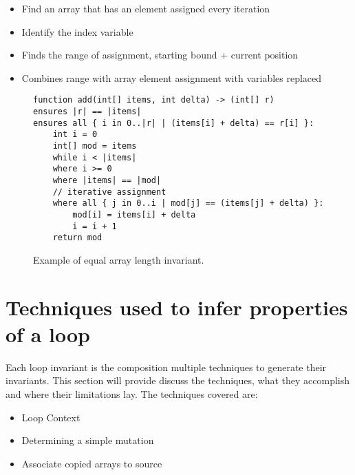 \begin{itemize}
	\item Find an array that has an element assigned every iteration
	\item Identify the index variable
	\item Finds the range of assignment, starting bound + current position
	\item Combines range with array element assignment with variables replaced
\end{itemize}


\begin{figure}[ht]
\begin{lstlisting}
function add(int[] items, int delta) -> (int[] r)
ensures |r| == |items|
ensures all { i in 0..|r| | (items[i] + delta) == r[i] }:
    int i = 0
    int[] mod = items
    while i < |items|
    where i >= 0
    where |items| == |mod|
    // iterative assignment
    where all { j in 0..i | mod[j] == (items[j] + delta) }:
        mod[i] = items[i] + delta
        i = i + 1
    return mod
\end{lstlisting}
\caption{Example of equal array length invariant.}
\label{lst:equal-array-len}
\end{figure}

\section{Techniques used to infer properties of a loop}

Each loop invariant is the composition multiple techniques to generate their
invariants. This section will provide discuss the techniques, what they
accomplish and where their limitations lay.
The techniques covered are:

\begin{itemize}
    \item{Loop Context}
    \item{Determining a simple mutation}
    \item{Associate copied arrays to source}
\end{itemize}

